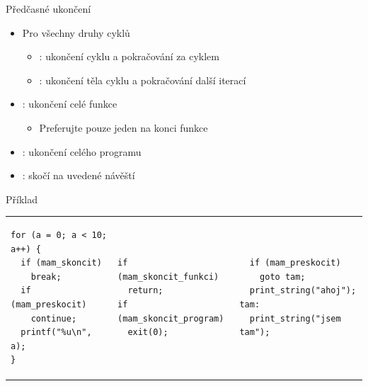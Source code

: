 \begin{frame}[fragile]{Předčasné ukončení}

  \begin{itemize}
    \item Pro všechny druhy cyklů
    \begin{itemize}
      \item {}: ukončení cyklu a pokračování za cyklem
      \item {}: ukončení těla cyklu a pokračování další iterací
    \end{itemize}

    \pause

    \item {}: ukončení celé funkce
    \begin{itemize}
      \item Preferujte pouze jeden  na konci funkce
    \end{itemize}
    \item {}: ukončení celého programu

    \pause

    \item {}: skočí na uvedené návěští
  \end{itemize}

\begin{block}{Příklad}
\begin{center}
\begin{tabular}{l|l|l}
\begin{lstlisting}
for (a = 0; a < 10; a++) {
  if (mam_skoncit)
    break;
  if (mam_preskocit)
    continue;
  printf("%u\n", a);
}
\end{lstlisting}
&
\begin{lstlisting}
if (mam_skoncit_funkci)
  return;
if (mam_skoncit_program)
  exit(0);
\end{lstlisting}
&
\begin{lstlisting}
  if (mam_preskocit)
    goto tam;
  print_string("ahoj");
tam:
  print_string("jsem tam");
\end{lstlisting}
\end{tabular}
\end{center}
\end{block}

\end{frame}

